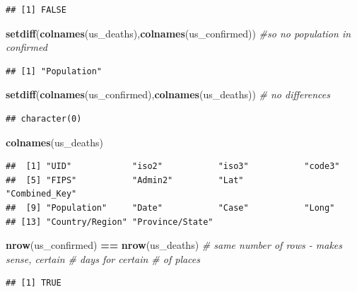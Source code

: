 \documentclass[
]{article}
\newenvironment{Shaded}{\begin{snugshade}}{\end{snugshade}}
\newcommand{\CommentTok}[1]{\textcolor[rgb]{0.56,0.35,0.01}{\textit{#1}}}
\newcommand{\KeywordTok}[1]{\textcolor[rgb]{0.13,0.29,0.53}{\textbf{#1}}}
\newcommand{\NormalTok}[1]{#1}
\newcommand{\OperatorTok}[1]{\textcolor[rgb]{0.81,0.36,0.00}{\textbf{#1}}}
\newcommand{\StringTok}[1]{\textcolor[rgb]{0.31,0.60,0.02}{#1}}
\begin{document}
\begin{verbatim}
## [1] FALSE
\end{verbatim}

\begin{Shaded}
\begin{Highlighting}[]
\KeywordTok{setdiff}\NormalTok{(}\KeywordTok{colnames}\NormalTok{(us_deaths),}\KeywordTok{colnames}\NormalTok{(us_confirmed)) }\CommentTok{#so no population in confirmed}
\end{Highlighting}
\end{Shaded}

\begin{verbatim}
## [1] "Population"
\end{verbatim}

\begin{Shaded}
\begin{Highlighting}[]
\KeywordTok{setdiff}\NormalTok{(}\KeywordTok{colnames}\NormalTok{(us_confirmed),}\KeywordTok{colnames}\NormalTok{(us_deaths)) }\CommentTok{# no differences}
\end{Highlighting}
\end{Shaded}

\begin{verbatim}
## character(0)
\end{verbatim}

\begin{Shaded}
\begin{Highlighting}[]
\KeywordTok{colnames}\NormalTok{(us_deaths)}
\end{Highlighting}
\end{Shaded}

\begin{verbatim}
##  [1] "UID"            "iso2"           "iso3"           "code3"         
##  [5] "FIPS"           "Admin2"         "Lat"            "Combined_Key"  
##  [9] "Population"     "Date"           "Case"           "Long"          
## [13] "Country/Region" "Province/State"
\end{verbatim}

\begin{Shaded}
\begin{Highlighting}[]
\KeywordTok{nrow}\NormalTok{(us_confirmed) }\OperatorTok{==}\StringTok{ }\KeywordTok{nrow}\NormalTok{(us_deaths) }\CommentTok{# same number of rows - makes sense, certain # days for certain # of places}
\end{Highlighting}
\end{Shaded}

\begin{verbatim}
## [1] TRUE
\end{verbatim}
\end{document}
